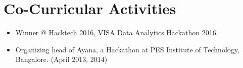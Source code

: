 \newcommand\textlcsc[1]{\textsc{\MakeTextLowercase{#1}}}
\section{Co-Curricular Activities}
\begin{itemize}
\setlength\itemsep{-5pt}
\item Winner @ Hacktech 2016, VISA Data Analytics Hackathon 2016.
\item Organizing head of Ayana, a Hackathon at PES Institute of Technology, Bangalore. \hspace{63pt} (April 2013, 2014)
\end{itemize}
